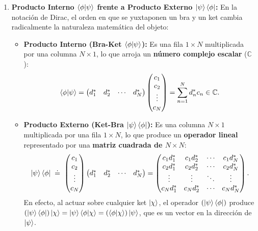 \begin{enumerate}
    \item \textbf{Producto Interno $\left\langle \phi \middle| \psi \right\rangle$ frente a Producto Externo $\left| \psi \right\rangle\left\langle \phi \right|$:}
    En la notación de Dirac, el orden en que se yuxtaponen un bra y un ket cambia radicalmente la naturaleza matemática del objeto:
    \begin{itemize}
        \item \textbf{Producto Interno (Bra-Ket $\left\langle \phi \middle| \psi \right\rangle$):} Es una fila $1\times N$ multiplicada por una columna $N\times 1$, lo que arroja un \textbf{número complejo escalar} ($\mathbb{C}$):
        \begin{equation}
            \left\langle \phi \middle| \psi \right\rangle = \begin{pmatrix} d_1^* & d_2^* & \cdots & d_N^* \end{pmatrix} \begin{pmatrix} c_1 \\ c_2 \\ \vdots \\ c_N \end{pmatrix} = \sum_{n=1}^N d_n^* c_n \in \mathbb{C}.
        \end{equation}
        \item \textbf{Producto Externo (Ket-Bra $\left| \psi \right\rangle\left\langle \phi \right|$):} Es una columna $N\times 1$ multiplicada por una fila $1\times N$, lo que produce un \textbf{operador lineal} representado por una \textbf{matriz cuadrada de $N\times N$}:
        \begin{equation}
            \left| \psi \right\rangle\left\langle \phi \right| \;\doteq\; \begin{pmatrix} c_1 \\ c_2 \\ \vdots \\ c_N \end{pmatrix} \begin{pmatrix} d_1^* & d_2^* & \cdots & d_N^* \end{pmatrix} = \begin{pmatrix}
                c_1 d_1^* & c_1 d_2^* & \cdots & c_1 d_N^* \\
                c_2 d_1^* & c_2 d_2^* & \cdots & c_2 d_N^* \\
                \vdots & \vdots & \ddots & \vdots \\
                c_N d_1^* & c_N d_2^* & \cdots & c_N d_N^*
            \end{pmatrix}.
        \end{equation}
        En efecto, al actuar sobre cualquier ket $\left| \chi \right\rangle$, el operador $(\left| \psi \right\rangle\left\langle \phi \right|)$ produce $\left(\left| \psi \right\rangle\left\langle \phi \right|\right)\left| \chi \right\rangle = \left| \psi \right\rangle\left\langle \phi \middle| \chi \right\rangle = (\left\langle \phi \middle| \chi \right\rangle)\left| \psi \right\rangle$, que es un vector en la dirección de $\left| \psi \right\rangle$.
    \end{itemize}


\end{enumerate}
